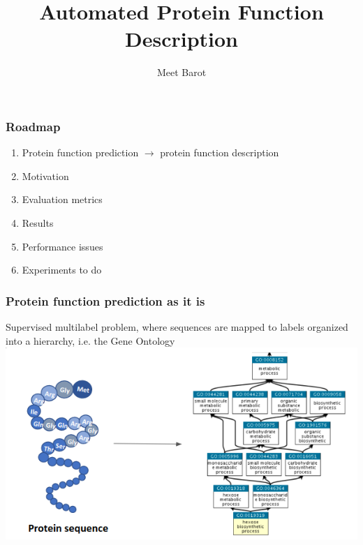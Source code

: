 \documentclass{beamer}
\title{Automated Protein Function Description}
\author{Meet Barot}
\begin{document}
\maketitle
\begin{frame}
\frametitle{Roadmap}
\begin{enumerate}
    \item Protein function prediction $\rightarrow$ protein function description
    \item Motivation
    \item Evaluation metrics
    \item Results
    \item Performance issues
    \item Experiments to do
\end{enumerate}
\end{frame}
\begin{frame}
    \frametitle{Protein function prediction as it is}
    Supervised multilabel problem, where sequences are mapped to labels organized into a hierarchy, i.e. the Gene Ontology
    \center\includegraphics[height=0.4\textheight]{sequence_to_go_tree.png}
\end{frame}
\end{document}
